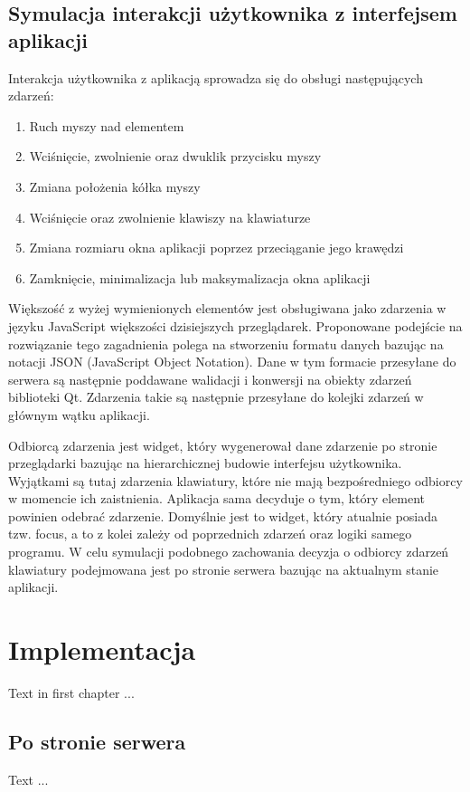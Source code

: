 \documentclass[polish]{inz}
\begin{document}
\section{Symulacja interakcji użytkownika z interfejsem aplikacji}
Interakcja użytkownika z aplikacją sprowadza się do obsługi następujących zdarzeń:
\begin{enumerate}
  \item Ruch myszy nad elementem
  \item Wciśnięcie, zwolnienie oraz dwuklik przycisku myszy
  \item Zmiana położenia kółka myszy
  \item Wciśnięcie oraz zwolnienie klawiszy na klawiaturze
  \item Zmiana rozmiaru okna aplikacji poprzez przeciąganie jego krawędzi
  \item Zamknięcie, minimalizacja lub maksymalizacja okna aplikacji
\end{enumerate}
Większość z wyżej wymienionych elementów jest obsługiwana jako zdarzenia w języku JavaScript większości dzisiejszych przeglądarek. Proponowane podejście na rozwiązanie tego zagadnienia polega na stworzeniu formatu danych bazując na notacji JSON (JavaScript Object Notation). Dane w tym formacie przesyłane do serwera są następnie poddawane walidacji i konwersji na obiekty zdarzeń biblioteki Qt. Zdarzenia takie są następnie przesyłane do kolejki zdarzeń w głównym wątku aplikacji. 

Odbiorcą zdarzenia jest widget, który wygenerował dane zdarzenie po stronie przeglądarki bazując na hierarchicznej budowie interfejsu użytkownika. Wyjątkami są tutaj zdarzenia klawiatury, które nie mają bezpośredniego odbiorcy w momencie ich zaistnienia. Aplikacja sama decyduje o tym, który element powinien odebrać zdarzenie. Domyślnie jest to widget, który atualnie posiada tzw. focus, a to z kolei zależy od poprzednich zdarzeń oraz logiki samego programu. W celu symulacji podobnego zachowania decyzja o odbiorcy zdarzeń klawiatury podejmowana jest po stronie serwera bazując na aktualnym stanie aplikacji.

\chapter{Implementacja}
Text in first chapter ...

\section{Po stronie serwera}
\label{sec:implementation_server}
Text ...
\end{document}
